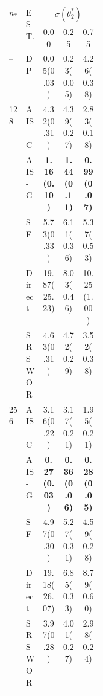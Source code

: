 \begin{tabular}{p{0.05\linewidth}p{0.13\linewidth}ccc}
  \toprule
  \multirow{2}{*}{$n_*$} & \multirow{2}{*}{EST.}& \multicolumn{3}{c}{$\sigma(\theta^*_2)$}         \\
  \cmidrule{3-5}
                         &                      & 0.00                & 0.25                & 0.75                \\
  \midrule
  \multirow{1}{*}{--}    & DP                   & {0.05(0.03)}        & {0.23(0.05)}        & {4.26(0.38)}        \\
  \midrule
  \multirow{5}{*}{128}   & AIS-C                & {4.32(0.31)}        & {4.39(0.27)}        & {2.83(0.18)}        \\
                         & AIS-G                & \textbf{1.16(0.10)} & \textbf{1.44(0.11)} & \textbf{0.99(0.07)} \\
                         & SF                   & {5.73(0.33)}        & {6.11(0.36)}        & {5.37(0.53)}        \\
                         & Direct               & {19.87(25.23)}      & {8.03(0.46)}        & {10.25(1.00)}       \\
                         & SRSWOR               & {4.63(0.31)}        & {4.72(0.29)}        & {3.52(0.38)}        \\
  \midrule
  \multirow{5}{*}{256}   & AIS-C                & {3.16(0.22)}        & {3.17(0.21)}        & {1.95(0.21)}        \\
                         & AIS-G                & \textbf{0.27(0.03)} & \textbf{0.36(0.06)} & \textbf{0.28(0.05)} \\
                         & SF                   & {4.97(0.30)}        & {5.27(0.31)}        & {4.59(0.28)}        \\
                         & Direct               & {19.18(26.07)}      & {6.85(0.33)}        & {8.79(0.60)}        \\
                         & SRSWOR               & {3.97(0.28)}        & {4.01(0.27)}        & {2.98(0.24)}        \\
  \bottomrule
\end{tabular}
